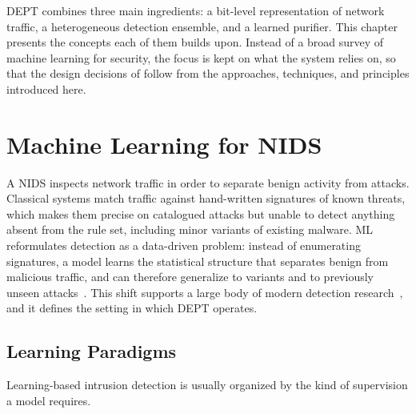 \label{chap:back}

DEPT combines three main ingredients: a bit-level representation of network traffic, a
heterogeneous detection ensemble, and a learned purifier. This chapter presents the
concepts each of them builds upon. Instead of a broad survey of machine learning for
security, the focus is kept on what the system relies on, so that the design decisions of
 follow from the approaches, techniques, and principles introduced here.

\section{Machine Learning for NIDS}\label{sec:bg-ml-nids}
A \ac{NIDS} inspects network traffic in order to separate benign activity from attacks.
Classical systems match traffic against hand-written signatures of known threats, which
makes them precise on catalogued attacks but unable to detect anything absent from the rule
set, including minor variants of existing malware. \ac{ML} reformulates detection as a
data-driven problem: instead of enumerating signatures, a model learns the statistical
structure that separates benign from malicious traffic, and can therefore generalize to
variants and to previously unseen attacks~\cite{boutaba2018comprehensive,wang2021machine}.
This shift supports a large body of modern detection
research~\cite{xu2025deep,anis2025survey}, and it defines the setting in which DEPT
operates.

\subsection{Learning Paradigms}\label{subsec:bg-paradigms}
Learning-based intrusion detection is usually organized by the kind of supervision a model
requires.

